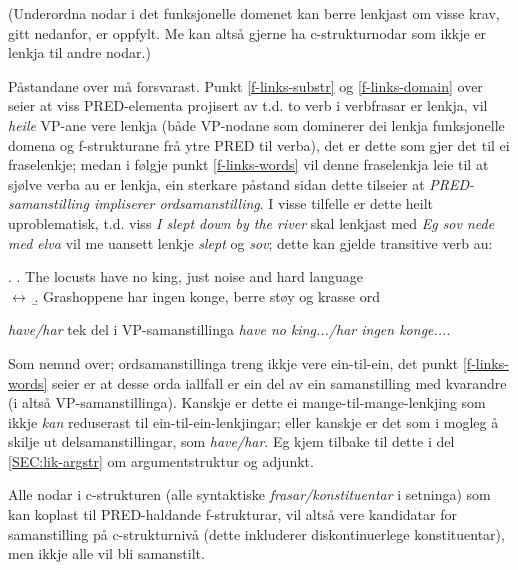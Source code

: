 \documentclass[11pt,a4paper,oneside,draft]{book}
\begin{document}
(Underordna nodar i det funksjonelle domenet kan berre lenkjast om
visse krav, gitt nedanfor, er oppfylt. Me kan altså gjerne ha
c-strukturnodar som ikkje er lenkja til andre nodar.)


Påstandane over må forsvarast. Punkt \ref{f-links-substr} og
\ref{f-links-domain} over seier at viss PRED-elementa projisert av
t.d. to verb i verbfrasar er lenkja, vil \emph{heile} VP-ane vere lenkja
(både VP-nodane som dominerer dei lenkja funksjonelle domena og
f-strukturane frå ytre PRED til verba), det er dette som gjer det til
ei fraselenkje; medan i følgje punkt \ref{f-links-words} vil denne
fraselenkja leie til at sjølve verba au er lenkja, ein sterkare
påstand sidan dette tilseier at \emph{PRED-samanstilling impliserer ordsamanstilling}. I visse tilfelle er dette heilt uproblematisk,
t.d. viss \emph{I slept down by the river} skal lenkjast med \emph{Eg sov nede med elva} vil me uansett lenkje \emph{slept} og \emph{sov}; dette kan gjelde
transitive verb au:

\ex. \a. The locusts have no king, just noise and hard language\\
     $\leftrightarrow$
     \b. Grashoppene har ingen konge, berre støy og krasse ord



\emph{have/har} tek del i VP-samanstillinga \emph{have no king.../har ingen konge...}.

Som nemnd over; ordsamanstillinga treng ikkje vere ein-til-ein, det
punkt \ref{f-links-words} seier er at desse orda iallfall er ein del
av ein samanstilling med kvarandre (i \Last altså
VP-samanstillinga). Kanskje er dette ei mange-til-mange-lenkjing som
ikkje \emph{kan} reduserast til ein-til-ein-lenkjingar; eller kanskje er
det som i \Last mogleg å skilje ut delsamanstillingar, som
\emph{have/har}. Eg kjem tilbake til dette i del \ref{SEC:lik-argstr} om
argumentstruktur og adjunkt. 


Alle nodar i c-strukturen (alle syntaktiske \emph{frasar/konstituentar} i
setninga) som kan koplast til PRED-haldande f-strukturar, vil altså
vere kandidatar for samanstilling på c-strukturnivå (dette inkluderer
diskontinuerlege konstituentar), men ikkje alle vil bli samanstilt.
\end{document}
